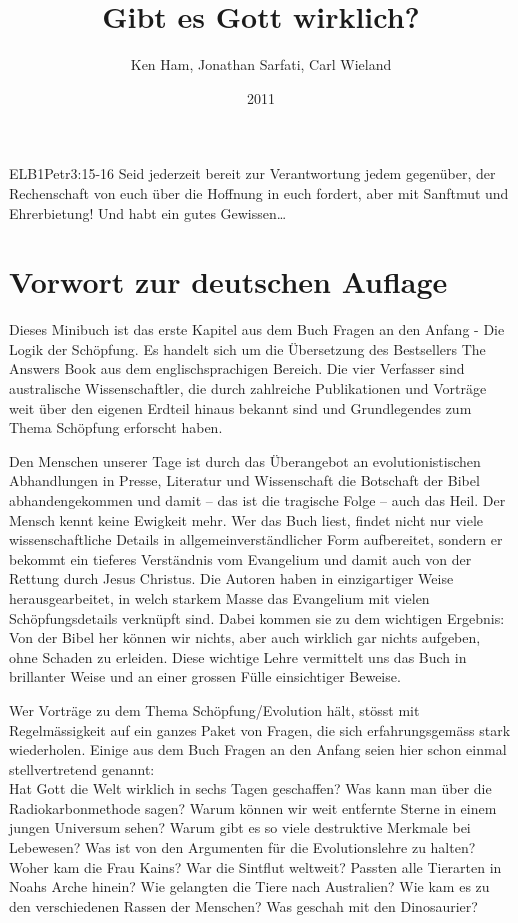 \documentclass{../inc/mybibbook}
\title{Gibt es Gott wirklich?}
\author{Ken Ham, Jonathan Sarfati, Carl Wieland}
\date{2011}
\begin{document}
\maketitle
\begin{bibelbox}{ELB}{1Petr}{3:15-16}
    Seid jederzeit bereit zur Verantwortung jedem gegenüber, der Rechenschaft von euch über die Hoffnung in euch fordert, aber mit Sanftmut und Ehrerbietung! Und habt ein gutes Gewissen\dots
\end{bibelbox}
\tableofcontents
\section{Vorwort zur deutschen Auflage}
Dieses Minibuch \cite{keith1} ist das erste Kapitel aus dem Buch \flqq Fragen an den Anfang - Die Logik der Schöpfung\frqq. Es handelt sich um die Übersetzung des Bestsellers \flqq The Answers Book\frqq{} aus dem englischsprachigen Bereich. Die vier Verfasser sind australische Wissenschaftler, die durch zahlreiche Publikationen und Vorträge weit über den eigenen Erdteil hinaus bekannt sind und Grundlegendes zum Thema Schöpfung erforscht haben.

Den Menschen unserer Tage ist durch das Überangebot an evolutionistischen Abhandlungen in Presse, Literatur und Wissenschaft die Botschaft der Bibel abhandengekommen und damit -- das ist die tragische Folge -- auch das Heil. Der Mensch kennt keine Ewigkeit mehr. Wer das Buch liest, findet nicht nur viele wissenschaftliche Details in allgemeinverständlicher Form aufbereitet, sondern er bekommt ein tieferes Verständnis vom Evangelium und damit auch von der Rettung durch Jesus Christus. Die Autoren haben in einzigartiger Weise herausgearbeitet, in welch starkem Masse das Evangelium mit vielen Schöpfungsdetails verknüpft sind. Dabei kommen sie zu dem wichtigen Ergebnis: Von der Bibel her können wir nichts, aber auch wirklich gar nichts aufgeben, ohne Schaden zu erleiden. Diese wichtige Lehre vermittelt uns das Buch in brillanter Weise und an einer grossen Fülle einsichtiger Beweise.

Wer Vorträge zu dem Thema Schöpfung/Evolution hält, stösst mit Regelmässigkeit auf ein ganzes Paket von Fragen, die sich erfahrungsgemäss stark wiederholen. Einige aus dem Buch \flqq Fragen an den Anfang\frqq{} seien hier schon einmal stellvertretend genannt:\\
Hat Gott die Welt wirklich in sechs Tagen geschaffen? Was kann man über die Radiokarbonmethode sagen? Warum können wir weit entfernte Sterne in einem jungen Universum sehen? Warum gibt es so viele destruktive Merkmale bei Lebewesen? Was ist von den Argumenten für die Evolutionslehre zu halten? Woher kam die Frau Kains? War die Sintflut weltweit? Passten alle Tierarten in Noahs Arche hinein? Wie gelangten die Tiere nach Australien? Wie kam es zu den verschiedenen Rassen der Menschen? Was geschah mit den Dinosaurier?
\end{document}
